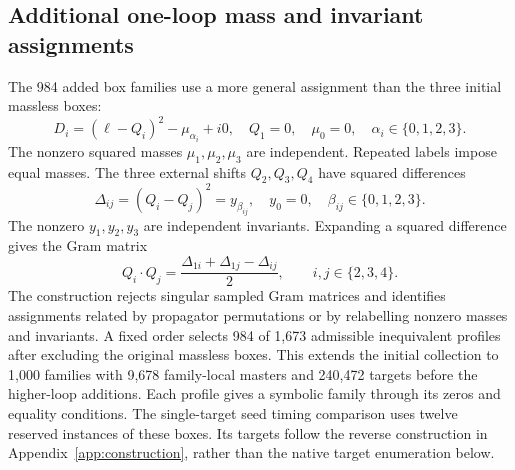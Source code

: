 \subsection{Additional one-loop mass and invariant assignments}
The 984 added box families use a more general assignment than the three initial massless boxes:
\begin{equation}
 D_i=(\ell-Q_i)^2-\mu_{\alpha_i}+i0,
 \quad Q_1=0,\quad \mu_0=0,\quad \alpha_i\in\{0,1,2,3\}.
\end{equation}
The nonzero squared masses $\mu_1,\mu_2,\mu_3$ are independent. Repeated labels impose equal masses. The three external shifts $Q_2,Q_3,Q_4$ have squared differences
\begin{equation}
 \Delta_{ij}=(Q_i-Q_j)^2=y_{\beta_{ij}},
 \quad y_0=0,\quad \beta_{ij}\in\{0,1,2,3\}.
\end{equation}
The nonzero $y_1,y_2,y_3$ are independent invariants. Expanding a squared difference gives the Gram matrix
\begin{equation}
 Q_i\cdot Q_j=\frac{\Delta_{1i}+\Delta_{1j}-\Delta_{ij}}2,
 \qquad i,j\in\{2,3,4\}.
\end{equation}
The construction rejects singular sampled Gram matrices and identifies assignments related by propagator permutations or by relabelling nonzero masses and invariants. A fixed order selects 984 of 1,673 admissible inequivalent profiles after excluding the original massless boxes. This extends the initial collection to 1,000 families with 9,678 family-local masters and 240,472 targets before the higher-loop additions. Each profile gives a symbolic family through its zeros and equality conditions. The single-target seed timing comparison uses twelve reserved instances of these boxes. Its targets follow the reverse construction in Appendix~\ref{app:construction}, rather than the native target enumeration below.

